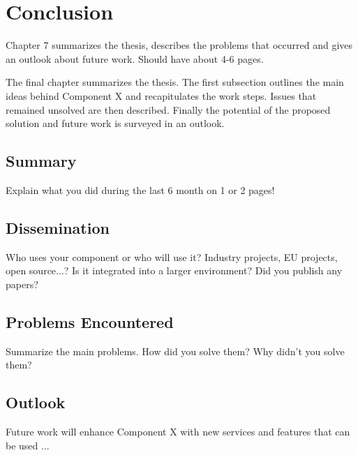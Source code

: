 \chapter{Conclusion\label{cha:chapter7}}

Chapter 7 summarizes the thesis, describes the problems that occurred and gives an outlook about future
work. Should have about 4-6 pages.

The final chapter summarizes the thesis. The first subsection outlines the main ideas
behind Component X and recapitulates the work steps. Issues that remained unsolved are
then described. Finally the potential of the proposed solution and future work is
surveyed in an outlook.

\section{Summary\label{sec:summary}}

Explain what you did during the last 6 month on 1 or 2 pages!

\section{Dissemination\label{sec:dissemination}}

Who uses your component or who will use it? Industry projects, EU projects,
open source...? Is it integrated into a larger environment? Did you publish any papers?

\section{Problems Encountered\label{sec:problems}}

Summarize the main problems. How did you solve them? Why didn't you solve them?

\section{Outlook\label{sec:outlook}}

Future work will enhance Component X with new services and features that can be used ...
